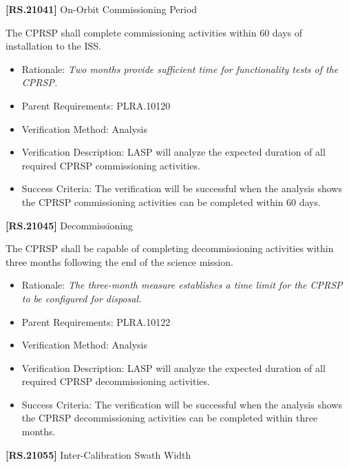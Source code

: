 \textbf{[RS.21041]} On-Orbit Commissioning Period

The \gls{CPRSP} shall complete commissioning activities within 60 days of installation to the \gls{ISS}.

\begin{itemize}
\item{} Rationale: \emph{Two months provide sufficient time for functionality tests of the CPRSP.}

\item{} Parent Requirements: PLRA.10120

\item{} Verification Method: Analysis

\item{} Verification Description: \gls{LASP} will analyze the expected duration of all required \gls{CPRSP} commissioning activities.

\item{} Success Criteria: The verification will be successful when the \gls{analysis} shows the \gls{CPRSP} commissioning activities can be completed within 60 days.

\end{itemize}

\textbf{[RS.21045]} Decommissioning

The \gls{CPRSP} shall be capable of completing decommissioning activities within three months following the end of the science mission.

\begin{itemize}
\item{} Rationale: \emph{The three-month measure establishes a time limit for the CPRSP to be configured for disposal.}

\item{} Parent Requirements: PLRA.10122

\item{} Verification Method: Analysis

\item{} Verification Description: \gls{LASP} will analyze the expected duration of all required \gls{CPRSP} decommissioning activities.

\item{} Success Criteria: The verification will be successful when the \gls{analysis} shows the \gls{CPRSP} decommissioning activities can be completed within three months.

\end{itemize}

\textbf{[RS.21055]} Inter-Calibration Swath Width

